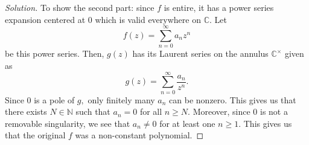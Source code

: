 \documentclass[12pt]{article}
\theoremstyle{definition}
\newenvironment{soln}{\begin{proof}[Solution]}{\end{proof}}
\begin{document}
\begin{enumerate}[leftmargin=*]
\begin{soln}
    	To show the second part: since $f$ is entire, it has a power series expansion centered at $0$ which is valid everywhere on $\mathbb{C}.$ Let 
    	\begin{equation*} 
    		f(z) = \sum_{n = 0}^{\infty}a_nz^n
    	\end{equation*}
    	be this power series. Then, $g(z)$ has its Laurent series on the annulus $\mathbb{C}^\times$ given as
    	\begin{equation*} 
    		g(z) = \sum_{n = 0}^{\infty}\dfrac{a_n}{z^n}.
    	\end{equation*}
    	Since $0$ is a pole of $g,$ only finitely many $a_n$ can be nonzero. This gives us that there exists $N \in \mathbb{N}$ such that $a_n = 0$ for all $n \ge N.$ Moreover, since $0$ is not a removable singularity, we see that $a_n \neq 0$ for at least one $n \ge 1.$ This gives us that the original $f$ was a non-constant polynomial.
    \end{soln}
\end{enumerate}
\end{document}
